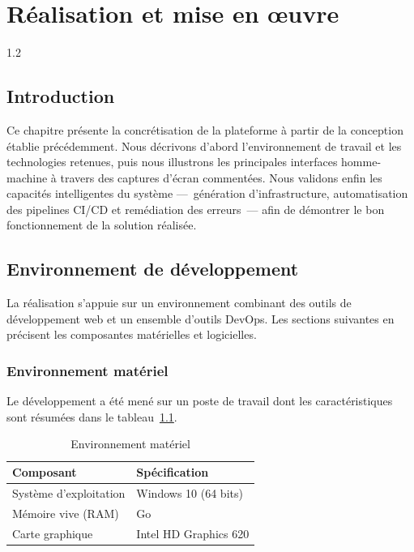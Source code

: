 \chapter{Réalisation et mise en œuvre}
\begin{spacing}{1.2}
\minitoc
\thispagestyle{MyStyle}
\end{spacing}
\clearpage

\section{Introduction}

Ce chapitre présente la concrétisation de la plateforme à partir de la conception
établie précédemment. Nous décrivons d'abord l'environnement de travail et les
technologies retenues, puis nous illustrons les principales interfaces homme-machine à
travers des captures d'écran commentées. Nous validons enfin les capacités
intelligentes du système ---~génération d'infrastructure, automatisation des pipelines
CI/CD et remédiation des erreurs~--- afin de démontrer le bon fonctionnement de la
solution réalisée.

\section{Environnement de développement}

La réalisation s'appuie sur un environnement combinant des outils de développement web
et un ensemble d'outils DevOps. Les sections suivantes en précisent les composantes
matérielles et logicielles.

\subsection{Environnement matériel}

Le développement a été mené sur un poste de travail dont les caractéristiques sont
résumées dans le tableau~\ref{tab:env-materiel}.

\begin{table}[H]
    \centering
    \caption{Environnement matériel}
    \label{tab:env-materiel}
    \begin{tabularx}{\textwidth}{@{}>{\raggedright\arraybackslash}p{5cm} >{\raggedright\arraybackslash}X@{}}
        \hline
        \textbf{Composant} & \textbf{Spécification} \\
        \hline
        Système d'exploitation & Windows 10 (64 bits) \\
        Mémoire vive (RAM) & 8 Go \\
        Carte graphique & Intel HD Graphics 620 \\
        \hline
    \end{tabularx}
\end{table}

